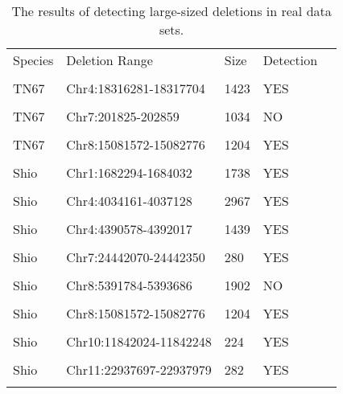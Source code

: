 \hfill
\begin{table}[!ht]
    \centering
    \begin{tabular}[t]{l|llll}
     Species & Deletion Range & Size & Detection\\\\
      \hline
      
     TN67  & Chr4:18316281-18317704 & 1423 & YES\\\\
     TN67  & Chr7:201825-202859 & 1034 & NO\\\\
     TN67  & Chr8:15081572-15082776 & 1204 & YES\\\\
     Shio  & Chr1:1682294-1684032 & 1738 & YES\\\\
     Shio  & Chr4:4034161-4037128 & 2967 & YES\\\\
     Shio  & Chr4:4390578-4392017 & 1439 & YES\\\\
     Shio  & Chr7:24442070-24442350 & 280 & YES\\\\
     Shio  & Chr8:5391784-5393686 & 1902 & NO\\\\
     Shio  & Chr8:15081572-15082776 & 1204 & YES\\\\
     Shio  & Chr10:11842024-11842248 & 224  & YES\\\\
     Shio  & Chr11:22937697-22937979 & 282 & YES\\\\


      
   \end{tabular}
    \caption{The results of detecting large-sized deletions in real data sets.}
    \label{}
\end{table}





